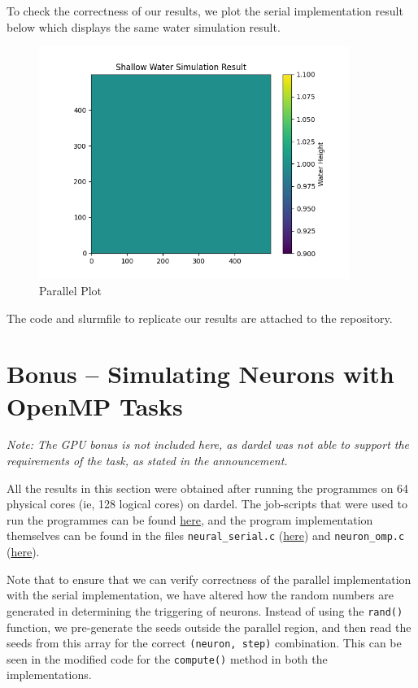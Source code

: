 \documentclass[a4paper,10pt]{article}
\begin{document}
To check the correctness of our results, we plot the serial implementation result below which displays the same water simulation result.

\begin{figure}[H]
  \centering
  \includegraphics[width=0.9\textwidth]{img/ex5/serial_plot.png}
  \caption{Parallel Plot}
  \label{fig:ex5_serial}
\end{figure}


The code and slurmfile to replicate our results are attached to the repository.

\section{Bonus -- Simulating Neurons with OpenMP Tasks}
\textit{Note: The GPU bonus is not included here, as dardel was not able to support the requirements of the task, as stated in the announcement.}

All the results in this section were obtained after running the programmes on 64 physical cores (ie, 128 logical cores) on dardel. The job-scripts that were used to run the programmes can be found \href{https://github.com/paulmyr/DD2356-MethodsHPC/tree/master/3_open_mp/bonus/neuron/job_scripts}{here}, and the program implementation themselves can be found in the files \verb|neural_serial.c| (\href{https://github.com/paulmyr/DD2356-MethodsHPC/blob/master/3_open_mp/bonus/neuron/neuron_serial.c}{here}) and \verb|neuron_omp.c| (\href{https://github.com/paulmyr/DD2356-MethodsHPC/blob/master/3_open_mp/bonus/neuron/neuron_omp.c}{here}). 

Note that to ensure that we can verify correctness of the parallel implementation with the serial implementation, we have altered how the random numbers are generated in determining the triggering of neurons. Instead of using the \verb|rand()| function, we pre-generate the seeds outside the parallel region, and then read the seeds from this array for the correct \verb|(neuron, step)| combination. This can be seen in the modified code for the \verb|compute()| method in both the implementations. 
\end{document}
